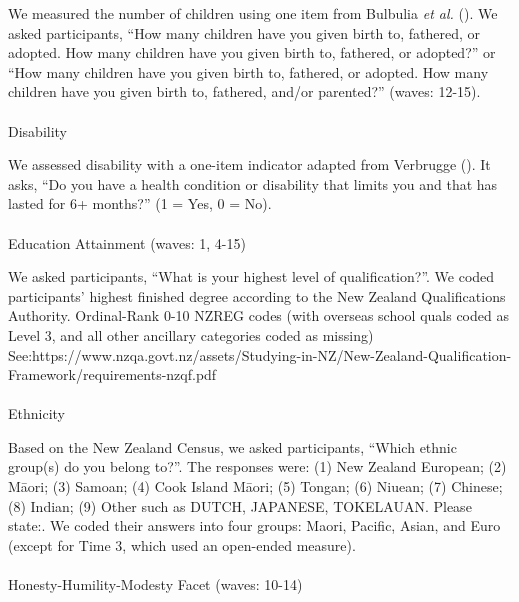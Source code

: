 \documentclass[
  single column]{article}
\makeatletter
\let\oldparagraph\paragraph
\renewcommand{\paragraph}{
    \@ifstar
      \xxxParagraphStar
      \xxxParagraphNoStar
  }
\newcommand{\xxxParagraphStar}[1]{\oldparagraph*{#1}\mbox{}}
\newcommand{\xxxParagraphNoStar}[1]{\oldparagraph{#1}\mbox{}}
\makeatother
\begin{document}
We measured the number of children using one item from Bulbulia \emph{et
al.} (). We asked participants, ``How
many children have you given birth to, fathered, or adopted. How many
children have you given birth to, fathered, or adopted?'' or ``How many
children have you given birth to, fathered, or adopted. How many
children have you given birth to, fathered, and/or parented?'' (waves:
12-15).

\paragraph{Disability}\label{disability}

We assessed disability with a one-item indicator adapted from Verbrugge
(). It asks, ``Do you have a health
condition or disability that limits you and that has lasted for 6+
months?'' (1 = Yes, 0 = No).

\paragraph{Education Attainment (waves: 1,
4-15)}\label{education-attainment-waves-1-4-15}

We asked participants, ``What is your highest level of qualification?''.
We coded participants' highest finished degree according to the New
Zealand Qualifications Authority. Ordinal-Rank 0-10 NZREG codes (with
overseas school quals coded as Level 3, and all other ancillary
categories coded as missing)
See:https://www.nzqa.govt.nz/assets/Studying-in-NZ/New-Zealand-Qualification-Framework/requirements-nzqf.pdf

\paragraph{Ethnicity}\label{ethnicity}

Based on the New Zealand Census, we asked participants, ``Which ethnic
group(s) do you belong to?''. The responses were: (1) New Zealand
European; (2) Māori; (3) Samoan; (4) Cook Island Māori; (5) Tongan; (6)
Niuean; (7) Chinese; (8) Indian; (9) Other such as DUTCH, JAPANESE,
TOKELAUAN. Please state:. We coded their answers into four groups:
Maori, Pacific, Asian, and Euro (except for Time 3, which used an
open-ended measure).

\paragraph{Honesty-Humility-Modesty Facet (waves:
10-14)}\label{honesty-humility-modesty-facet-waves-10-14}
\end{document}
